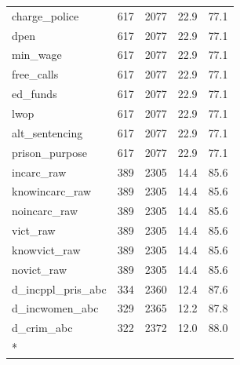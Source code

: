 \begin{longtable}[t]{lrrrr}
charge\_police & 617 & 2077 & 22.9 & 77.1\\
dpen & 617 & 2077 & 22.9 & 77.1\\
min\_wage & 617 & 2077 & 22.9 & 77.1\\
\addlinespace
free\_calls & 617 & 2077 & 22.9 & 77.1\\
ed\_funds & 617 & 2077 & 22.9 & 77.1\\
lwop & 617 & 2077 & 22.9 & 77.1\\
alt\_sentencing & 617 & 2077 & 22.9 & 77.1\\
prison\_purpose & 617 & 2077 & 22.9 & 77.1\\
\addlinespace
incarc\_raw & 389 & 2305 & 14.4 & 85.6\\
knowincarc\_raw & 389 & 2305 & 14.4 & 85.6\\
noincarc\_raw & 389 & 2305 & 14.4 & 85.6\\
vict\_raw & 389 & 2305 & 14.4 & 85.6\\
knowvict\_raw & 389 & 2305 & 14.4 & 85.6\\
\addlinespace
novict\_raw & 389 & 2305 & 14.4 & 85.6\\
d\_incppl\_pris\_abc & 334 & 2360 & 12.4 & 87.6\\
d\_incwomen\_abc & 329 & 2365 & 12.2 & 87.8\\
d\_crim\_abc & 322 & 2372 & 12.0 & 88.0\\*
\end{longtable}
\endgroup{}
